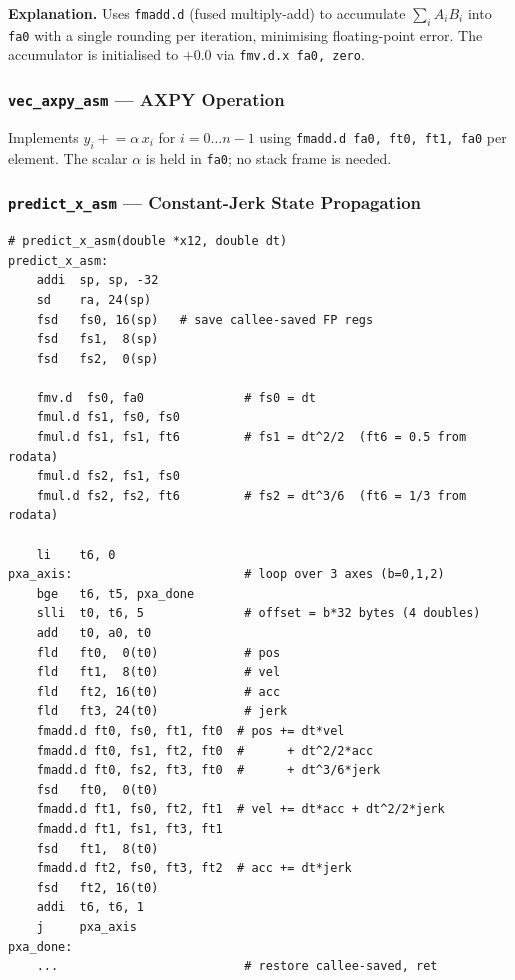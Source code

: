 \documentclass[12pt,a4paper]{article}
\newcommand{\reg}[1]{\texttt{\color{reg}#1}}
\newcommand{\insn}[1]{\texttt{\color{keyword}#1}}
\newcommand{\func}[1]{\texttt{\bfseries #1}}
\begin{document}
\textbf{Explanation.}
Uses \insn{fmadd.d} (fused multiply-add) to accumulate
$\sum_i A_i B_i$ into \reg{fa0} with a single rounding per
iteration, minimising floating-point error. The accumulator is
initialised to $+0.0$ via \insn{fmv.d.x fa0, zero}.

\subsubsection{\func{vec\_axpy\_asm} --- AXPY Operation}

Implements $y_i \mathrel{+}= \alpha \, x_i$ for $i = 0 \ldots n-1$
using \insn{fmadd.d fa0, ft0, ft1, fa0} per element. The scalar
$\alpha$ is held in \reg{fa0}; no stack frame is needed.

\subsubsection{\func{predict\_x\_asm} --- Constant-Jerk State Propagation}

\begin{lstlisting}[caption={\func{predict\_x\_asm}: constant-jerk transition for one joint},label=lst:predict]
# predict_x_asm(double *x12, double dt)
predict_x_asm:
    addi  sp, sp, -32
    sd    ra, 24(sp)
    fsd   fs0, 16(sp)   # save callee-saved FP regs
    fsd   fs1,  8(sp)
    fsd   fs2,  0(sp)

    fmv.d  fs0, fa0              # fs0 = dt
    fmul.d fs1, fs0, fs0
    fmul.d fs1, fs1, ft6         # fs1 = dt^2/2  (ft6 = 0.5 from rodata)
    fmul.d fs2, fs1, fs0
    fmul.d fs2, fs2, ft6         # fs2 = dt^3/6  (ft6 = 1/3 from rodata)

    li    t6, 0
pxa_axis:                        # loop over 3 axes (b=0,1,2)
    bge   t6, t5, pxa_done
    slli  t0, t6, 5              # offset = b*32 bytes (4 doubles)
    add   t0, a0, t0
    fld   ft0,  0(t0)            # pos
    fld   ft1,  8(t0)            # vel
    fld   ft2, 16(t0)            # acc
    fld   ft3, 24(t0)            # jerk
    fmadd.d ft0, fs0, ft1, ft0  # pos += dt*vel
    fmadd.d ft0, fs1, ft2, ft0  #      + dt^2/2*acc
    fmadd.d ft0, fs2, ft3, ft0  #      + dt^3/6*jerk
    fsd   ft0,  0(t0)
    fmadd.d ft1, fs0, ft2, ft1  # vel += dt*acc + dt^2/2*jerk
    fmadd.d ft1, fs1, ft3, ft1
    fsd   ft1,  8(t0)
    fmadd.d ft2, fs0, ft3, ft2  # acc += dt*jerk
    fsd   ft2, 16(t0)
    addi  t6, t6, 1
    j     pxa_axis
pxa_done:
    ...                          # restore callee-saved, ret
\end{lstlisting}
\end{document}
